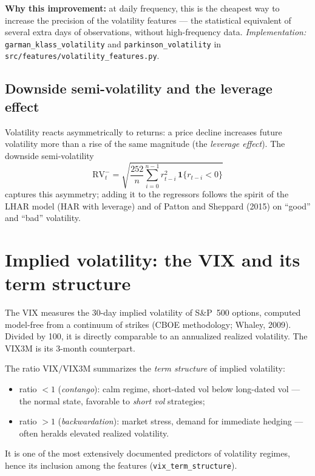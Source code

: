 \documentclass[11pt,a4paper]{article}
\newcommand{\RV}{\mathrm{RV}}
\begin{document}
\textbf{Why this improvement:} at daily frequency, this is the cheapest way
to increase the precision of the volatility features --- the statistical
equivalent of several extra days of observations, without high-frequency
data. \emph{Implementation:} \texttt{garman\_klass\_volatility} and
\texttt{parkinson\_volatility} in
\texttt{src/features/volatility\_features.py}.

\subsection{Downside semi-volatility and the leverage effect}

Volatility reacts asymmetrically to returns: a price decline increases future
volatility more than a rise of the same magnitude (the \emph{leverage
effect}). The downside semi-volatility
\begin{equation}
\RV^{-}_t = \sqrt{\frac{252}{n}\sum_{i=0}^{n-1} r_{t-i}^2\,
\mathbf{1}\{r_{t-i}<0\}}
\end{equation}
captures this asymmetry; adding it to the regressors follows the spirit of
the LHAR model (HAR with leverage) and of Patton and Sheppard (2015) on
``good'' and ``bad'' volatility.

\section{Implied volatility: the VIX and its term structure}

The VIX measures the 30-day implied volatility of S\&P~500 options, computed
model-free from a continuum of strikes (CBOE methodology; Whaley, 2009).
Divided by 100, it is directly comparable to an annualized realized
volatility. The VIX3M is its 3-month counterpart.

The ratio $\mathrm{VIX}/\mathrm{VIX3M}$ summarizes the \emph{term structure}
of implied volatility:
\begin{itemize}
\item ratio $<1$ (\emph{contango}): calm regime, short-dated vol below
  long-dated vol --- the normal state, favorable to \emph{short vol}
  strategies;
\item ratio $>1$ (\emph{backwardation}): market stress, demand for immediate
  hedging --- often heralds elevated realized volatility.
\end{itemize}
It is one of the most extensively documented predictors of volatility
regimes, hence its inclusion among the features
(\texttt{vix\_term\_structure}).
\end{document}
